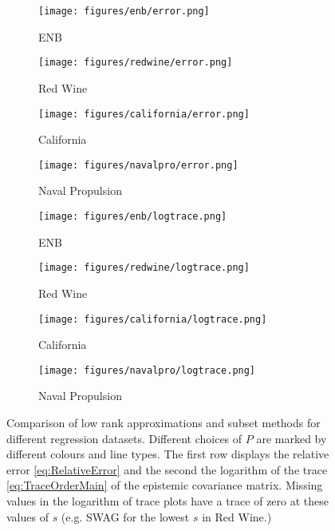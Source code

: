 \begin{figure*}[t!]
    \centering
    \begin{subfigure}{0.22\textwidth}
        \centering
        \texttt{[image: figures/enb/error.png]}
        \caption{ENB}
        \label{subfig:rel_error_enb}
    \end{subfigure}
    \hfill
    \begin{subfigure}{0.22\textwidth}
        \centering
        \texttt{[image: figures/redwine/error.png]}
        \caption{Red Wine}
        \label{subfig:rel_error_redwine}
    \end{subfigure}
    \hfill
    \begin{subfigure}{0.22\textwidth}
        \centering
        \texttt{[image: figures/california/error.png]}
        \caption{California}
        \label{subfig:rel_error_california}
    \end{subfigure}
    \hfill
    \begin{subfigure}{0.22\textwidth}
        \centering
        \texttt{[image: figures/navalpro/error.png]}
        \caption{Naval Propulsion}
        \label{subfig:rel_error_navalpro}
    \end{subfigure}
    
    \vspace{0.1cm}
    
    \begin{subfigure}{0.22\textwidth}
        \centering
        \texttt{[image: figures/enb/logtrace.png]}
        \caption{ENB}
        \label{fig:enb}
    \end{subfigure}
    \hfill
    \begin{subfigure}{0.23\textwidth}
        \centering
        \texttt{[image: figures/redwine/logtrace.png]}
        \caption{Red Wine}
        \label{fig:redwine}
    \end{subfigure}
    \hfill
    \begin{subfigure}{0.22\textwidth}
        \centering
        \texttt{[image: figures/california/logtrace.png]}
        \caption{California}
        \label{fig:california}
    \end{subfigure}
    \hfill
    \begin{subfigure}{0.23\textwidth}
        \centering
        \texttt{[image: figures/navalpro/logtrace.png]}
        \caption{Naval Propulsion}
        \label{fig:navalpro}
    \end{subfigure}

    \caption{Comparison of low rank approximations and subset methods for different regression datasets. Different choices of $P$ are marked by different colours and line types. The first row displays the relative error \eqref{eq:RelativeError} and the second the logarithm of the trace \eqref{eq:TraceOrderMain} of the epistemic covariance matrix. Missing values in the logarithm of trace plots have a trace of zero at these values of $s$ (e.g. SWAG for the lowest $s$ in Red Wine.)}
    \label{fig:regression_plots}
\end{figure*}

